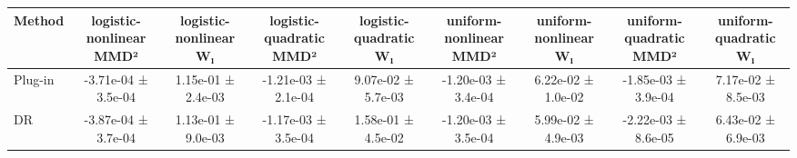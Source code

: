 \begin{tabular}{lcccccccc}
\toprule
Method & logistic-nonlinear MMD² & logistic-nonlinear W₁ & logistic-quadratic MMD² & logistic-quadratic W₁ & uniform-nonlinear MMD² & uniform-nonlinear W₁ & uniform-quadratic MMD² & uniform-quadratic W₁ \\
\midrule
Plug-in & -3.71e-04 ± 3.5e-04 & 1.15e-01 ± 2.4e-03 & -1.21e-03 ± 2.1e-04 & 9.07e-02 ± 5.7e-03 & -1.20e-03 ± 3.4e-04 & 6.22e-02 ± 1.0e-02 & -1.85e-03 ± 3.9e-04 & 7.17e-02 ± 8.5e-03 \\
DR & -3.87e-04 ± 3.7e-04 & 1.13e-01 ± 9.0e-03 & -1.17e-03 ± 3.5e-04 & 1.58e-01 ± 4.5e-02 & -1.20e-03 ± 3.5e-04 & 5.99e-02 ± 4.9e-03 & -2.22e-03 ± 8.6e-05 & 6.43e-02 ± 6.9e-03 \\
\bottomrule
\end{tabular}

